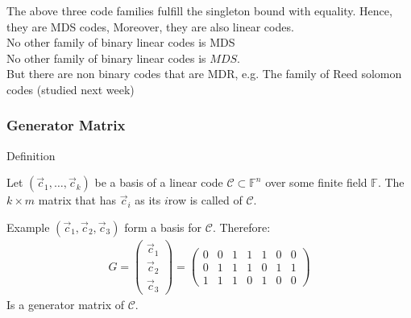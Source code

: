 The above three code families fulfill the singleton bound with equality. Hence, they are MDS codes, Moreover, they are also linear codes.\\
No other family of binary linear codes is MDS\\
No other family of binary linear codes is $MDS$.\\
But there are non binary codes that are MDR, e.g. The family of Reed solomon codes (studied next week)

\subsubsection{Generator Matrix}

\begin{parag}{Definition}
    \begin{definition}
        Let $\left(\vec{c}_1, \ldots, \vec{c}_k\right)$ be a basis of a linear code $\mathcal{C} \subset \mathbb{F}^n$ over some finite field $\mathbb{F}$. The $k \times m $ matrix that has $\vec{c}_i$  as its $i$\Th row is called   of $\mathcal{C}$.
    \end{definition}
    \begin{subparag}{Example}
        $\left(\vec{c}_1, \vec{c}_2, \vec{c}_3\right)$ form a basis for $\mathcal{C}$. Therefore:
        \begin{align*} 
            G =  \begin{pmatrix} \vec{c}_1 \\ \vec{c}_2 \\ \vec{c}_3 \end{pmatrix} = \begin{pmatrix} 0 & 0 & 1 & 1 & 1 & 0 & 0 \\ 0  & 1 & 1 & 1 & 0 & 1 & 1 \\ 1 & 1 & 1 & 0 & 1 & 0 & 0 \end{pmatrix} 
        \end{align*}
        Is a generator matrix of $\mathcal{C}$.
    \end{subparag}
\end{parag}
